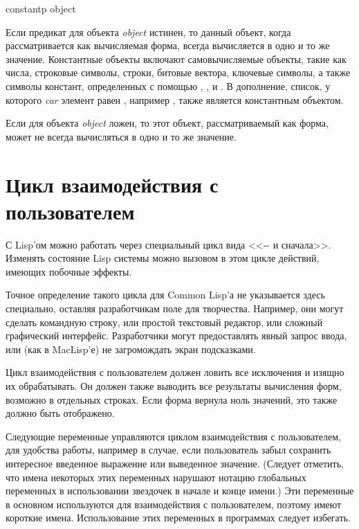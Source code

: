 \begin{defun}[Function]
constantp object

Если предикат  для объекта \emph{object} истинен, то данный
объект, когда рассматривается как вычисляемая форма, всегда вычисляется в одно и
то же значение.
Константные объекты включают самовычисляемые объекты, такие как числа, строковые
символы, строки, битовые вектора, ключевые символы, а также символы констант,
определенных с помощью , ,  и .
В дополнение, список, у которого \emph{car} элемент равен , например
, также является константным объектом.

Если  для объекта \emph{object} ложен, то этот объект,
рассматриваемый как форма, может не всегда вычисляться в одно и то же
значение.
\end{defun}

\section{Цикл взаимодействия с пользователем}

С Lisp'ом можно работать через специальный цикл вида
<<-- и сначала>>.
Изменять состояние Lisp системы можно вызовом в этом цикле действий, имеющих
побочные эффекты.  

Точное определение такого цикла для Common Lisp'а не указывается здесь
специально, оставляя разработчикам поле для творчества.
Например, они могут сделать командную строку, или простой текстовый редактор,
или сложный графический интерфейс. Разработчики могут предоставлять явный запрос
ввода, или (как в MacLisp'е) не загромождать экран подсказками.

Цикл взаимодействия с пользователем должен ловить все исключения и изящно их
обрабатывать. Он должен также выводить все результаты вычисления форм, возможно
в отдельных строках. Если форма вернула ноль значений, это также должно быть
отображено.

Следующие переменные управляются циклом взаимодействия с пользователем, для
удобства работы, например в случае, если пользователь забыл сохранить
интересное введенное выражение или выведенное значение. (Следует отметить, что
имена некоторых этих переменных нарушают нотацию глобальных переменных в
использовании звездочек в начале и конце имени.) Эти переменные в основном
используются для взаимодействия с пользователем, поэтому имеют короткие
имена. Использование этих переменных в программах следует избегать.

